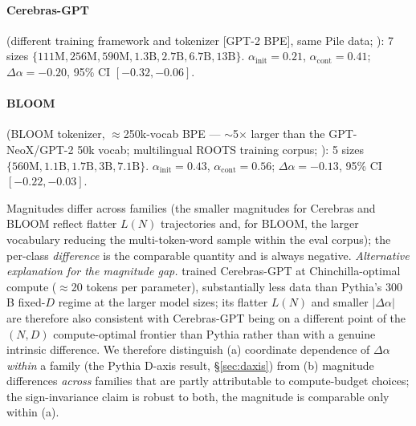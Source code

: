\documentclass[10pt]{article}
\newcommand{\dalpha}{\Delta\alpha}
\newcommand{\ainit}{\alpha_\mathrm{init}}
\newcommand{\acont}{\alpha_\mathrm{cont}}
\begin{document}
\paragraph{Cerebras-GPT} (different training framework and tokenizer
[GPT-2 BPE], same Pile data; \citealp{dey2023cerebras}): 7 sizes
$\{111\text{M}, 256\text{M}, 590\text{M}, 1.3\text{B}, 2.7\text{B},
6.7\text{B}, 13\text{B}\}$.
$\ainit = 0.21$, $\acont = 0.41$;
$\dalpha = \mathbf{-0.20}$, 95\% CI $\mathbf{[-0.32, -0.06]}$.

\paragraph{BLOOM} (BLOOM tokenizer, $\approx$250k-vocab BPE ---
$\sim$5$\times$ larger than the GPT-NeoX/GPT-2 50k vocab; multilingual
ROOTS training corpus; \citealp{bigscience2022bloom}): 5 sizes
$\{560\text{M}, 1.1\text{B}, 1.7\text{B}, 3\text{B}, 7.1\text{B}\}$.
$\ainit = 0.43$, $\acont = 0.56$;
$\dalpha = \mathbf{-0.13}$, 95\% CI $\mathbf{[-0.22, -0.03]}$.

Magnitudes differ across families (the smaller magnitudes for
Cerebras and BLOOM reflect flatter $L(N)$ trajectories and, for
BLOOM, the larger vocabulary reducing the multi-token-word sample
within the eval corpus); the per-class \emph{difference} is the
comparable quantity and is always negative.
\textit{Alternative explanation for the magnitude gap.}
\citet{dey2023cerebras} trained Cerebras-GPT at Chinchilla-optimal
compute ($\approx$20 tokens per parameter), substantially less data
than Pythia's 300\,B fixed-$D$ regime at the larger model sizes; its
flatter $L(N)$ and smaller $|\dalpha|$ are therefore also consistent
with Cerebras-GPT being on a different point of the $(N, D)$
compute-optimal frontier than Pythia rather than with a genuine
intrinsic difference. We therefore distinguish (a) coordinate
dependence of $\dalpha$ \emph{within} a family (the Pythia D-axis
result, \S\ref{sec:daxis}) from (b) magnitude differences \emph{across}
families that are partly attributable to compute-budget choices; the
sign-invariance claim is robust to both, the magnitude is comparable
only within (a).
\end{document}
